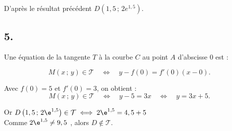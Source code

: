 D'après le résultat précédent \(D\left(1,5\,;\,2 e^{1,5}\right)\).

\subsection*{5.}

Une équation de la tangente \(T\) à la courbe \(C\) au point \(A\) d'abscisse \(0\) est :

\[
M(x\,;\,y) \in \mathcal T \quad \Longleftrightarrow \quad y - f(0) = f'(0)(x - 0).
\]

Avec \(f(0) = 5\) et \(f'(0) = 3\), on obtient :
\[
M(x\,;\,y) \in \mathcal T \quad \iff \quad y - 5 = 3x \quad \iff \quad y = 3x + 5.
\]

Or $D\left(1,5\,;\,2 \e^{1,5}\right) \in \mathcal T \iff 2\e^{1,5} = 4,5 + 5 $\\
Comme $ 2 \e^{1,5} \neq 9,5$ , alors $ D \notin \mathcal T$.
